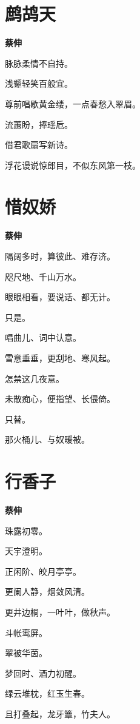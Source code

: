 \documentclass[12pt,a4paper]{ctexbook}
\begin{document}
\section{鹧鸪天}
\textbf{蔡伸}\par\vspace{0.5em}
脉脉柔情不自持。\par
浅颦轻笑百般宜。\par
尊前唱歇黄金缕，一点春愁入翠眉。\par
流蕙盼，捧瑶卮。\par
借君歌扇写新诗。\par
浮花谩说惊郎目，不似东风第一枝。\par

\section{惜奴娇}
\textbf{蔡伸}\par\vspace{0.5em}
隔阔多时，算彼此、难存济。\par
咫尺地、千山万水。\par
眼眼相看，要说话、都无计。\par
只是。\par
唱曲儿、词中认意。\par
雪意垂垂，更刮地、寒风起。\par
怎禁这几夜意。\par
未散痴心，便指望、长偎倚。\par
只替。\par
那火桶儿、与奴暖被。\par

\section{行香子}
\textbf{蔡伸}\par\vspace{0.5em}
珠露初零。\par
天宇澄明。\par
正闲阶、皎月亭亭。\par
更阑人静，烟敛风清。\par
更井边桐，一叶叶，做秋声。\par
斗帐鸾屏。\par
翠被华茵。\par
梦回时、酒力初醒。\par
绿云堆枕，红玉生春。\par
且打叠起，龙牙簟，竹夫人。\par
\end{document}
